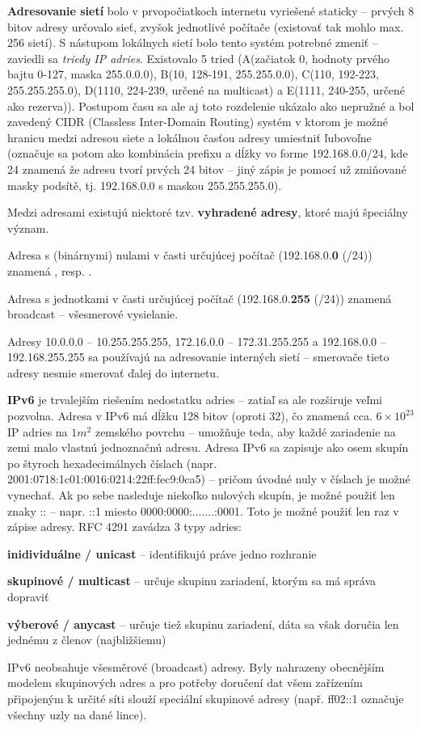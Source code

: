 \textbf{Adresovanie sietí} bolo v prvopočiatkoch internetu vyriešené staticky -- prvých 8 bitov adresy určovalo sieť, zvyšok jednotlivé počítače (existovať tak mohlo max. 256 sietí). S nástupom lokálnych sietí bolo tento systém potrebné zmeniť -- zaviedli sa \emph{triedy IP adries}. Existovalo 5 tried (A(začiatok 0, hodnoty prvého bajtu 0-127, maska 255.0.0.0), B(10, 128-191, 255.255.0.0), C(110, 192-223, 255.255.255.0), D(1110, 224-239, určené na multicast) a E(1111, 240-255, určené ako rezerva)). Postupom času sa ale aj toto rozdelenie ukázalo ako nepružné a bol zavedený CIDR (Classless Inter-Domain Routing) systém v ktorom je možné hranicu medzi adresou siete a lokálnou časťou adresy umiestniť ľubovoľne (označuje sa potom ako kombinácia prefixu a dĺžky vo forme 192.168.0.0/24, kde 24 znamená že adresu tvorí prvých 24 bitov -- jiný zápis je pomocí už zmiňované masky podsítě, tj. 192.168.0.0 s maskou 255.255.255.0).

Medzi adresami existujú niektoré tzv. \textbf{vyhradené adresy}, ktoré majú špeciálny význam.
\begin{pitemize}
	\item Adresa s (binárnymi) nulami v časti určujúcej počítač (192.168.0.\textbf{0} (/24)) znamená , resp. .
	\item Adresa s jednotkami v časti určujúcej počítač (192.168.0.\textbf{255} (/24)) znamená broadcast -- všesmerové vysielanie.
	\item Adresy 10.0.0.0 -- 10.255.255.255, 172.16.0.0 -- 172.31.255.255 a 192.168.0.0 -- 192.168.255.255 sa používajú na adresovanie interných sietí -- smerovače tieto adresy nesmie smerovať ďalej do internetu.
\end{pitemize}

\textbf{IPv6} je trvalejším riešením nedostatku adries -- zatiaľ sa ale rozširuje veľmi pozvolna. Adresa v IPv6 má dĺžku 128 bitov (oproti 32), čo znamená cca. $6 \times 10^{23}$ IP adries na $1 m^2$ zemského povrchu -- umožňuje teda, aby každé zariadenie na zemi malo vlastnú jednoznačnú adresu. Adresa IPv6 sa zapisuje ako osem skupín po štyroch hexadecimálnych číslach (napr. 2001:0718:1c01:0016:0214:22ff:fec9:0ca5) -- pričom úvodné nuly v číslach je možné vynechať. Ak po sebe nasleduje niekoľko nulových skupín, je možné použiť len znaky :: -- napr. ::1 miesto 0000:0000:.......:0001. Toto je možné použiť len raz v zápise adresy. RFC 4291 zavádza 3 typy adries:
\begin{pitemize}
	\item \textbf{inidividuálne / unicast} -- identifikujú práve jedno rozhranie
	\item \textbf{skupinové / multicast} -- určuje skupinu zariadení, ktorým sa má správa dopraviť
	\item \textbf{výberové / anycast} -- určuje tiež skupinu zariadení, dáta sa však doručia len jednému z členov (najbližšiemu)
\end{pitemize}
IPv6 neobsahuje všesměrové (broadcast) adresy. Byly nahrazeny obecnějším modelem skupinových adres a pro potřeby doručení dat všem zařízením připojeným k určité síti slouží speciální skupinové adresy (např. ff02::1 označuje všechny uzly na dané lince).

